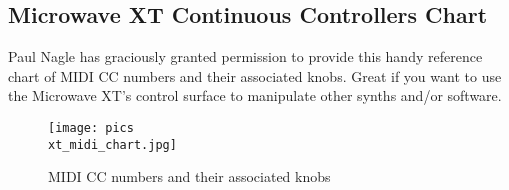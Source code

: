 \subsection{Microwave XT Continuous Controllers Chart}
Paul Nagle has graciously granted permission to provide this handy reference chart of MIDI CC numbers and their associated knobs. Great if you want to use the Microwave XT's control surface to manipulate other synths and/or software.\\
\bigskip %
%
\begin{figure}[ht!]
	\centering
	\texttt{[image: pics\\xt\_midi\_chart.jpg]}
	\caption{MIDI CC numbers and their associated knobs}
	\label{midi_cc_interface}
\end{figure}